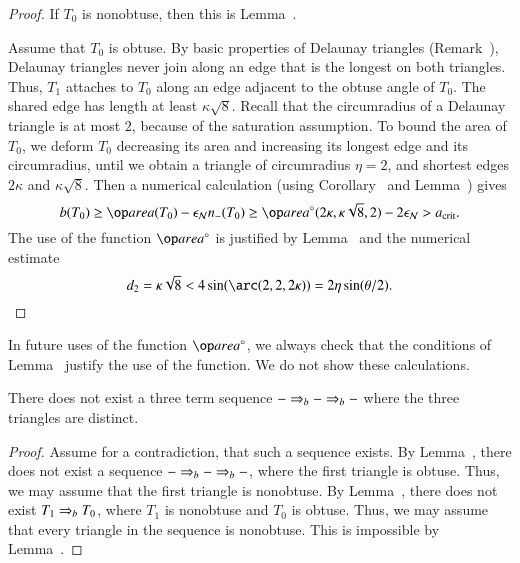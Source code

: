 \begin{proof}  
  If $T_0$ is nonobtuse, then this is Lemma~.

  Assume that $T_0$ is obtuse.  By basic properties of Delaunay
  triangles (Remark~), Delaunay triangles never join
  along an edge that is the longest on both triangles.  Thus, $T_1$
  attaches to $T_0$ along an edge adjacent to the obtuse angle of
  $T_0$.  The shared edge has length at least $\kappa\sqrt8$.  
  Recall that the circumradius of a Delaunay triangle is at most $2$,
  because of the saturation assumption.  To
  bound the area of $T_0$, we deform $T_0$ decreasing its area and
  increasing its longest edge and its circumradius, until we obtain a
  triangle of circumradius $\eta=2$, and shortest edges $2\kappa$ and
  $\kappa\sqrt{8}$.  Then a numerical calculation (using
  Corollary~ and Lemma~) gives
\[
b(T_0) \ge \area(T_0) - \epsN n_-(T_0) \ge 
\areta(2\kappa,\kappa\sqrt{8},2) - 2\epsN > \acrit.
\] 
The use of the function $\areta$ is justified by
Lemma~ and the numerical estimate
\[
d_2 = \kappa\sqrt8 
<  4 \sin(\arc(2,2,2\kappa)) = 2\eta\sin(\theta/2).
\] 
\end{proof}

In future uses of the function $\areta$, we always check that the
conditions of Lemma~ justify the use of the function.
We do not show these calculations.

\begin{lemma}  There does not exist a three
  term sequence $- \Rightarrow_{b} -\Rightarrow_{b} -$ where the three triangles are
  distinct.
\end{lemma}

\begin{proof}  
  Assume for a contradiction, that such a sequence exists.  By
  Lemma~, there does not exist a sequence $- \Rightarrow_{b} -
  \Rightarrow_{b} -$, where the first triangle is obtuse.  Thus, we may assume
  that the first triangle is nonobtuse.  By Lemma~,
  there does not exist $T_1\Rightarrow_{b} T_0$, where $T_1$ is nonobtuse and
  $T_0$ is obtuse.  Thus, we may assume that every triangle in the
  sequence is nonobtuse.  This is impossible by
  Lemma~.
\end{proof}

